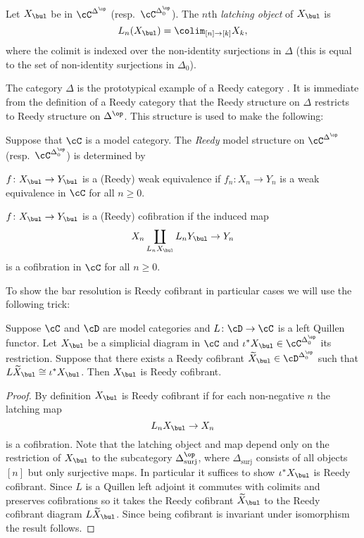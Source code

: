 \documentclass[leqno,oneside,english]{elsarticle}
\begin{document}
\begin{defn}\label{def:latching-obj}
  Let $X_\bul$ be in $\cC^{\Delta^{\op}}$
  (resp.~$\cC^{\Delta^{\op}_0}$).  The $n$th \emph{latching object} of
  $X_\bul$ is
  \[
  L_n (X_\bul) = \colim_{[n] \to [k]} X_k,
  \]
  where the colimit is indexed over the non-identity surjections in
  $\Delta$ (this is equal to the set of non-identity surjections in
  $\Delta_0$).
\end{defn}

The category $\Delta$ is the prototypical example of a Reedy category \cite[\S~15.1]{Hir03}. It is immediate from the definition of a Reedy category that the Reedy structure on $\Delta$ restricts to Reedy structure on $\Delta^\op$. This structure is used to make the following:
\begin{defn}
  Suppose that $\cC$ is a model category.  The \emph{Reedy} model structure
  on $\cC^{\Delta^{\op}}$ (resp.~$\cC^{\Delta_0^{\op}}$) is determined by 
  \begin{hypothenumerate}
    \item $f\colon X_{\bul}\rightarrow Y_{\bul}$ is a (Reedy) weak
    equivalence if $f_n\colon X_n\rightarrow Y_n$ is a
    weak equivalence in $\cC$ for all $n\geq 0$.

    \item $f\colon X_{\bul}\rightarrow Y_{\bul}$ is a (Reedy)
    cofibration if the induced map \[ X_n\coprod_{L_n X_{\bul}} L_n
    Y_{\bul }\rightarrow Y_n\] is a cofibration in $\cC$ for all $n\geq
    0$.
  \end{hypothenumerate}
\end{defn}

To show the bar resolution is Reedy cofibrant in particular cases we
will use the following trick:
\begin{prop}\label{prop:trick}
  Suppose $\cC$ and $\cD$ are model categories and $L\colon
  \cD\rightarrow \cC$ is a left Quillen functor. Let $X_{\bul}$ be a
  simplicial diagram in $\cC$ and $\iota^*X_{\bul}\in
  \cC^{\Delta^{\op}_0}$ its restriction. Suppose that there
  exists a Reedy cofibrant $\widetilde{X}_{\bul}\in
  \cD^{\Delta_{0}^{\op}}$ such that $L\widetilde{X}_{\bul}\cong
  \iota^*X_{\bul}$. Then $X_{\bul}$ is Reedy cofibrant.
\end{prop}
\begin{proof}
By definition $X_\bul$ is Reedy cofibrant if for each
non-negative $n$ the latching map 
\[
  L_n X_\bul \to X_n
\]
is a cofibration. Note that the latching object and map depend only on
the restriction of $X_\bul$ to the subcategory
$\Delta^{\op}_{\text{surj}}$, where $\Delta_{\text{surj}}$ consists of
all objects $[n]$ but only surjective maps.  In particular it suffices
to show $\iota^*X_{\bul}$ is Reedy cofibrant. Since $L$ is a Quillen left
adjoint it commutes with colimits and preserves cofibrations so it takes
the Reedy cofibrant $\widetilde{X}_{\bul}$ to the Reedy cofibrant
diagram $L\widetilde{X}_{\bul}$. Since being cofibrant is invariant
under isomorphism the result follows.
\end{proof}
\end{document}
